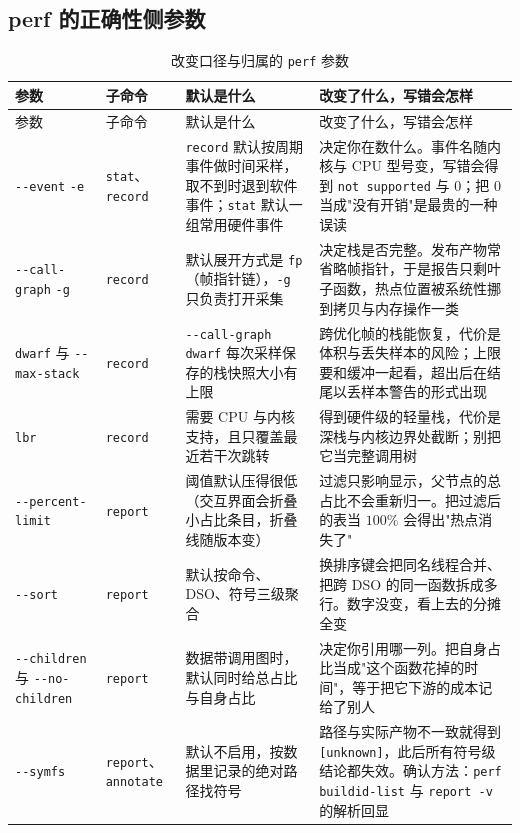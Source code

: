 \documentclass[12pt,a4paper,fontset=fandol]{ctexbook}
\newcommand{\Tp}[1]{\texttt{#1}}
\newcommand{\Opt}[1]{\texttt{-\/-#1}}
\newcommand{\Bk}{\discretionary{}{}{}}
\begin{document}
\subsection{perf 的正确性侧参数}
\label{sub:pmapB-perf-correct}

\begin{longtable}{>{\raggedright\arraybackslash}p{} >{\raggedright\arraybackslash}p{} >{\raggedright\arraybackslash}p{} >{\raggedright\arraybackslash}p{}}
\caption{改变口径与归属的 \Tp{perf} 参数}\label{tab:pmapB-perf-correct}\\
\toprule
参数 & 子命令 & 默认是什么 & 改变了什么，写错会怎样 \\
\midrule
\endfirsthead
\toprule
参数 & 子命令 & 默认是什么 & 改变了什么，写错会怎样 \\
\midrule
\endhead
\bottomrule
\endlastfoot
\Opt{event} \Tp{-e} & \Tp{stat}、\Tp{record} & \Tp{record} 默认按周期事件做时间采样，取不到时退到软件事件；\Tp{stat} 默认一组常用硬件事件 & 决定你在数什么。事件名随内核与 CPU 型号变，写错会得到 \Tp{not supported} 与 $0$；把 $0$ 当成"没有开销"是最贵的一种误读 \\
\Opt{call-{\Bk}graph} \Tp{-g} & \Tp{record} & 默认展开方式是 \Tp{fp}（帧指针链），\Tp{-g} 只负责打开采集 & 决定栈是否完整。发布产物常省略帧指针，于是报告只剩叶子函数，热点位置被系统性挪到拷贝与内存操作一类 \\
\Tp{dwarf} 与 \Opt{max-stack} & \Tp{record} & \Opt{call-{\Bk}graph} \Tp{dwarf} 每次采样保存的栈快照大小有上限 & 跨优化帧的栈能恢复，代价是体积与丢失样本的风险；上限要和缓冲一起看，超出后在结尾以丢样本警告的形式出现 \\
\Tp{lbr} & \Tp{record} & 需要 CPU 与内核支持，且只覆盖最近若干次跳转 & 得到硬件级的轻量栈，代价是深栈与内核边界处截断；别把它当完整调用树 \\
\Opt{percent-{\Bk}limit} & \Tp{report} & 阈值默认压得很低（交互界面会折叠小占比条目，折叠线随版本变） & 过滤只影响显示，父节点的总占比不会重新归一。把过滤后的表当 $100\%$ 会得出"热点消失了" \\
\Opt{sort} & \Tp{report} & 默认按命令、DSO、符号三级聚合 & 换排序键会把同名线程合并、把跨 DSO 的同一函数拆成多行。数字没变，看上去的分摊全变 \\
\Opt{children} 与 \Opt{no-{\Bk}children} & \Tp{report} & 数据带调用图时，默认同时给总占比与自身占比 & 决定你引用哪一列。把自身占比当成"这个函数花掉的时间"，等于把它下游的成本记给了别人 \\
\Opt{symfs} & \Tp{report}、\Tp{annotate} & 默认不启用，按数据里记录的绝对路径找符号 & 路径与实际产物不一致就得到 \Tp{[unknown]}，此后所有符号级结论都失效。确认方法：\Tp{perf buildid-{\Bk}list} 与 \Tp{report -v} 的解析回显 \\

\end{longtable}
\end{document}
